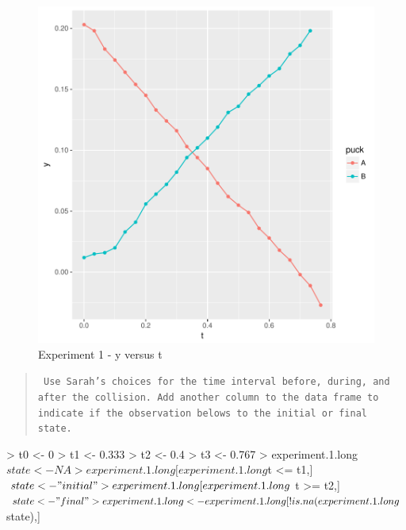 \documentclass[11pt]{article}
\begin{document}
\begin{figure}[!h]
\includegraphics{lab5-v1-fig-exp-1yt}
     \caption{Experiment 1 - y versus t}
     \label{exp-1yt}
\end{figure}

\begin{quote}
{\tt
Use Sarah's choices for the time interval before, during, and after the collision.
Add another column to the data frame to indicate if the observation belows to the initial or final state.
}
\end{quote}

\begin{Schunk}
\begin{Sinput}
> t0 <- 0
> t1 <- 0.333
> t2 <- 0.4
> t3 <- 0.767
> experiment.1.long$state <- NA
> experiment.1.long[experiment.1.long$t <= t1,]$state <- "initial"
> experiment.1.long[experiment.1.long$t >= t2,]$state <- "final"
> experiment.1.long <- experiment.1.long[!is.na(experiment.1.long$state),]
\end{Sinput}
\end{Schunk}
\end{document}
